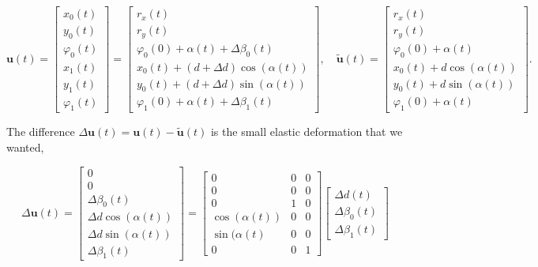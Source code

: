 \begin{equation}
\renewcommand\arraystretch{1.5}
\boldsymbol{u}(t) = \begin{bmatrix}
x_0(t) \\
y_0(t) \\
\varphi_0(t) \\
x_1(t) \\
y_1(t) \\
\varphi_1(t)
\end{bmatrix}
 = \begin{bmatrix}
r_x(t) \\
r_y(t) \\
\varphi_0(0) + \alpha(t) + \Delta\beta_0(t) \\
x_0(t) + (d + \Delta d)\cos(\alpha(t)) \\
y_0(t) + (d + \Delta d)\sin(\alpha(t)) \\
\varphi_1(0) + \alpha(t) + \Delta\beta_1(t)
\end{bmatrix},
\quad
\tilde{\boldsymbol{u}}(t) = \begin{bmatrix}
r_x(t) \\
r_y(t) \\
\varphi_0(0) + \alpha(t) \\
x_0(t) + d\cos(\alpha(t)) \\
y_0(t) + d\sin(\alpha(t)) \\
\varphi_1(0) + \alpha(t)
\end{bmatrix}.
\end{equation}

The difference $\Delta\boldsymbol{u}(t) = \boldsymbol{u}(t) - \tilde{\boldsymbol{u}}(t)$ is the small elastic deformation that we wanted,

\begin{equation}
\renewcommand\arraystretch{1.5}
\Delta\boldsymbol{u}(t) = \begin{bmatrix}
0 \\
0 \\
\Delta\beta_0(t) \\
\Delta d\cos(\alpha(t)) \\
\Delta d\sin(\alpha(t)) \\
\Delta\beta_1(t)
\end{bmatrix}
=
\begin{bmatrix}
0 & 0 & 0 \\
0 & 0 & 0 \\
0 & 1 & 0 \\
\cos(\alpha(t)) & 0 & 0 \\
\sin(\alpha(t) & 0 & 0 \\
0 & 0 & 1
\end{bmatrix}
\begin{bmatrix}
\Delta d(t) \\
\Delta \beta_0(t) \\
\Delta \beta_1(t)
\end{bmatrix}
\end{equation}

